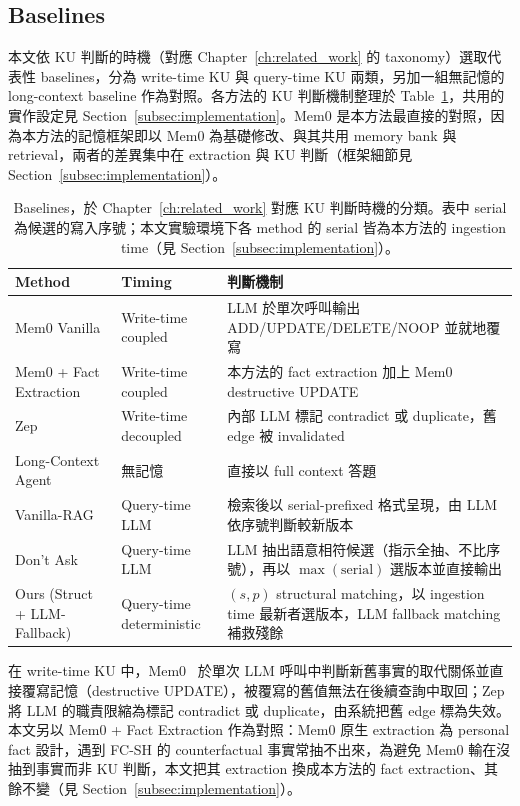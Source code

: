 \subsection{Baselines}
\label{subsec:baselines}
本文依 KU 判斷的時機（對應 Chapter~\ref{ch:related_work} 的 taxonomy）選取代表性 baselines，分為 write-time KU 與 query-time KU 兩類，另加一組無記憶的 long-context baseline 作為對照。各方法的 KU 判斷機制整理於 Table~\ref{tab:baselines}，共用的實作設定見 Section~\ref{subsec:implementation}。Mem0 是本方法最直接的對照，因為本方法的記憶框架即以 Mem0 為基礎修改、與其共用 memory bank 與 retrieval，兩者的差異集中在 extraction 與 KU 判斷（框架細節見 Section~\ref{subsec:implementation}）。
 
\begin{table}[!htb]
\centering
\caption{Baselines，於 Chapter~\ref{ch:related_work} 對應 KU 判斷時機的分類。表中 serial 為候選的寫入序號；本文實驗環境下各 method 的 serial 皆為本方法的 ingestion time（見 Section~\ref{subsec:implementation}）。}
\label{tab:baselines}
\small
\begin{tabularx}{\linewidth}{llX}
\toprule
Method & Timing & 判斷機制 \\
\midrule
Mem0 Vanilla~\cite{chhikara2025mem0} & Write-time coupled & LLM 於單次呼叫輸出 ADD/UPDATE/DELETE/NOOP 並就地覆寫 \\
Mem0 + Fact Extraction~\cite{chhikara2025mem0} & Write-time coupled & 本方法的 fact extraction 加上 Mem0 destructive UPDATE \\
Zep~\cite{rasmussen2025zep} & Write-time decoupled & 內部 LLM 標記 contradict 或 duplicate，舊 edge 被 invalidated \\
Long-Context Agent & 無記憶 & 直接以 full context 答題 \\
Vanilla-RAG & Query-time LLM & 檢索後以 serial-prefixed 格式呈現，由 LLM 依序號判斷較新版本 \\
Don't Ask~\cite{reddy2026don} & Query-time LLM & LLM 抽出語意相符候選（指示全抽、不比序號），再以 $\max(\text{serial})$ 選版本並直接輸出 \\
\midrule
Ours (Struct + LLM-Fallback) & Query-time deterministic & $(s, p)$ structural matching，以 ingestion time 最新者選版本，LLM fallback matching 補救殘餘 \\
\bottomrule
\end{tabularx}
\end{table}
 
在 write-time KU 中，Mem0~\cite{chhikara2025mem0} 於單次 LLM 呼叫中判斷新舊事實的取代關係並直接覆寫記憶（destructive UPDATE），被覆寫的舊值無法在後續查詢中取回；Zep~\cite{rasmussen2025zep} 將 LLM 的職責限縮為標記 contradict 或 duplicate，由系統把舊 edge 標為失效。本文另以 Mem0 + Fact Extraction 作為對照：Mem0 原生 extraction 為 personal fact 設計，遇到 FC-SH 的 counterfactual 事實常抽不出來，為避免 Mem0 輸在沒抽到事實而非 KU 判斷，本文把其 extraction 換成本方法的 fact extraction、其餘不變（見 Section~\ref{subsec:implementation}）。
 
